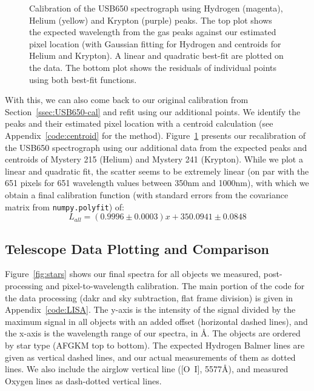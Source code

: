 \documentclass[twocolumn]{aastex702}
\begin{document}
			\begin{figure}
				\caption{Calibration of the USB650 spectrograph using Hydrogen (magenta), Helium (yellow) and Krypton (purple) peaks. The top plot shows the expected wavelength from the gas peaks against our estimated pixel location (with Gaussian fitting for Hydrogen and centroids for Helium and Krypton). A linear and quadratic best-fit are plotted on the data. The bottom plot shows the residuals of individual points using both best-fit functions.}
				\label{fig:31-cal-full}
			\end{figure}
			
			With this, we can also come back to our original calibration from Section~\ref{ssec:USB650-cal} and refit using our additional points. We identify the peaks and their estimated pixel location with a centroid calculation (see Appendix~\ref{code:centroid} for the method). Figure~\ref{fig:31-cal-full} presents our recalibration of the USB650 spectrograph using our additional data from the expected peaks and centroids of Mystery 215 (Helium) and Mystery 241 (Krypton). While we plot a linear and quadratic fit, the scatter seems to be extremely linear (on par with the 651 pixels for 651 wavelength values between 350nm and 1000nm), with which we obtain a final calibration function (with standard errors from the covariance matrix from \texttt{numpy.polyfit}) of:
			\begin{equation}\label{eq:31-cal-final}
				L_{all} = (0.9996 \pm 0.0003)x + 350.0941 \pm 0.0848
			\end{equation}
			
		\subsection{Telescope Data Plotting and Comparison}\label{ssec:telescope-data}
		
			Figure~\ref{fig:stars} shows our final spectra for all objects we measured, post-processing and pixel-to-wavelength calibration. The main portion of the code for the data processing (dakr and sky subtraction, flat frame division) is given in Appendix~\ref{code:LISA}.	The y-axis is the intensity of the signal divided by the maximum signal in all objects with an added offset (horizontal dashed lines), and the x-axis is the wavelength range of our spectra, in Å. The objects are ordered	by star type (AFGKM top to bottom). The expected Hydrogen Balmer lines are given as vertical dashed lines, and our actual measurements of them as dotted lines. We also include the airglow vertical line ([O~I], 5577Å), and measured Oxygen lines as dash-dotted vertical lines.
			
\end{document}
